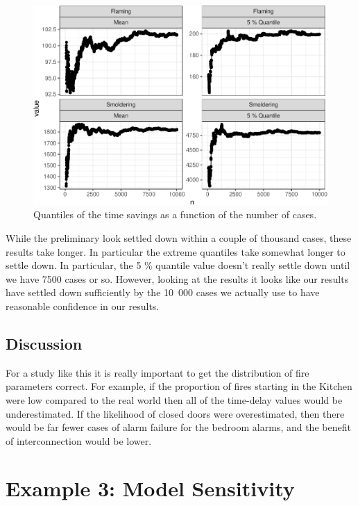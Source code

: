 \documentclass[12pt,twoside]{book}
\begin{document}
\begin{figure}[h!]
\centering
\includegraphics[width=4.5in]{FIGURES/cvg_plot-1.pdf}
\caption{Quantiles of the time savings as a function of the number of cases.}
\label{Ex_3-quintiles}
\end{figure}

While the preliminary look settled down within a couple of thousand cases, these results take longer. In particular the extreme quantiles take somewhat longer to settle down. In particular, the 5 \% quantile value doesn't really settle down until we have 7500 cases or so. However, looking at the results it looks like our results have settled down sufficiently by the 10~000 cases we actually use to have reasonable confidence in our results.

\hypertarget{discussion}{%
\subsection{Discussion}\label{discussion}}

For a study like this it is really important to get the distribution of fire parameters correct. For example, if the proportion of fires starting in the Kitchen were low compared to the real world then all of the time-delay values would be underestimated. If the likelihood of closed doors were overestimated, then there would be far fewer cases of alarm failure for the bedroom alarms, and the benefit of interconnection would be lower.

%
%

\section{Example 3: Model Sensitivity}
\end{document}
